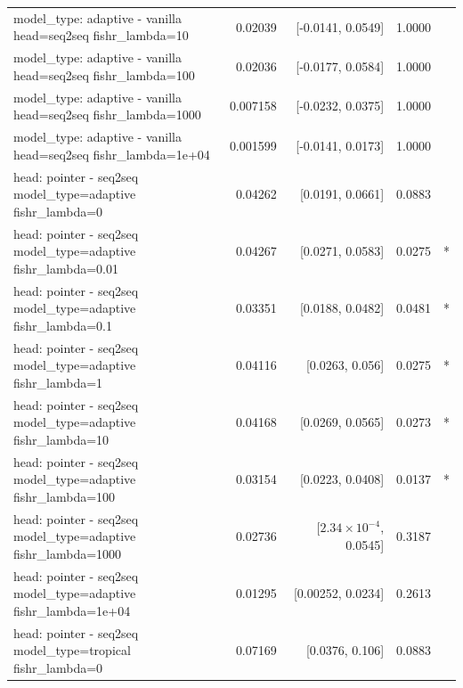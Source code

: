 \documentclass[10pt]{article}
\makeatletter
\newcommand{\stackcell}[1]{\begin{tabular}[t]{@{}l@{}}#1\end{tabular}}
\makeatother
\begin{document}
{\begin{longtable}{lrrrl}
\stackcell{model\_type: adaptive - vanilla\\\footnotesize head=seq2seq fishr\_lambda=10 } & 0.02039 & [-0.0141, 0.0549] & 1.0000 & \\
\stackcell{model\_type: adaptive - vanilla\\\footnotesize head=seq2seq fishr\_lambda=100 } & 0.02036 & [-0.0177, 0.0584] & 1.0000 & \\
\stackcell{model\_type: adaptive - vanilla\\\footnotesize head=seq2seq fishr\_lambda=1000 } & 0.007158 & [-0.0232, 0.0375] & 1.0000 & \\
\stackcell{model\_type: adaptive - vanilla\\\footnotesize head=seq2seq fishr\_lambda=1e+04 } & 0.001599 & [-0.0141, 0.0173] & 1.0000 & \\
\stackcell{head: pointer - seq2seq\\\footnotesize model\_type=adaptive fishr\_lambda=0 } & 0.04262 & [0.0191, 0.0661] & 0.0883 & \\
\stackcell{head: pointer - seq2seq\\\footnotesize model\_type=adaptive fishr\_lambda=0.01 } & 0.04267 & [0.0271, 0.0583] & 0.0275 & *\\
\stackcell{head: pointer - seq2seq\\\footnotesize model\_type=adaptive fishr\_lambda=0.1 } & 0.03351 & [0.0188, 0.0482] & 0.0481 & *\\
\stackcell{head: pointer - seq2seq\\\footnotesize model\_type=adaptive fishr\_lambda=1 } & 0.04116 & [0.0263, 0.056] & 0.0275 & *\\
\stackcell{head: pointer - seq2seq\\\footnotesize model\_type=adaptive fishr\_lambda=10 } & 0.04168 & [0.0269, 0.0565] & 0.0273 & *\\
\stackcell{head: pointer - seq2seq\\\footnotesize model\_type=adaptive fishr\_lambda=100 } & 0.03154 & [0.0223, 0.0408] & 0.0137 & *\\
\stackcell{head: pointer - seq2seq\\\footnotesize model\_type=adaptive fishr\_lambda=1000 } & 0.02736 & [$2.34\times10^{-4}$, 0.0545] & 0.3187 & \\
\stackcell{head: pointer - seq2seq\\\footnotesize model\_type=adaptive fishr\_lambda=1e+04 } & 0.01295 & [0.00252, 0.0234] & 0.2613 & \\
\stackcell{head: pointer - seq2seq\\\footnotesize model\_type=tropical fishr\_lambda=0 } & 0.07169 & [0.0376, 0.106] & 0.0883 & \\

\end{longtable}}
\end{document}
